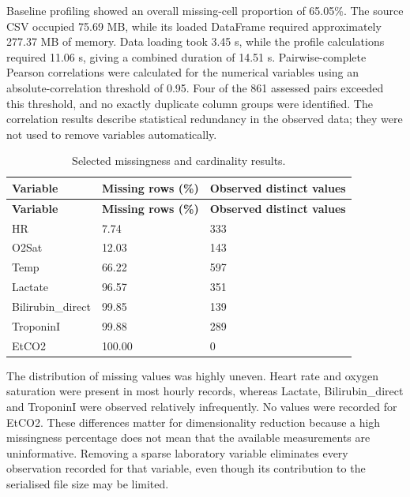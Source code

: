 Baseline profiling showed an overall missing-cell proportion of 65.05\%. The source CSV occupied 75.69 MB, while its loaded DataFrame required approximately 277.37 MB of memory. Data loading took 3.45 s, while the profile calculations required 11.06 s, giving a combined duration of 14.51 s.
Pairwise-complete Pearson
correlations were calculated for the numerical variables using an
absolute-correlation threshold of 0.95. Four of the 861 assessed pairs
exceeded this threshold, and no exactly duplicate column groups were
identified. The correlation results describe statistical redundancy in
the observed data; they were not used to remove variables automatically.

\begin{longtable}[]{@{}lll@{}}
	\caption{Selected missingness and cardinality results.}\label{tab:chapter4-1}\\
	\toprule\noalign{}
	\textbf{Variable} & \textbf{Missing rows (\%)} & \textbf{Observed distinct values} \\
	\midrule\noalign{}
	\endfirsthead
	\toprule\noalign{}
	\textbf{Variable} & \textbf{Missing rows (\%)} & \textbf{Observed distinct values} \\
	\midrule\noalign{}
	\endhead
	\bottomrule\noalign{}
	\endlastfoot
	HR & 7.74 & 333 \\
	O2Sat & 12.03 & 143 \\
	Temp & 66.22 & 597 \\
	Lactate & 96.57 & 351 \\
	Bilirubin\_direct & 99.85 & 139 \\
	TroponinI & 99.88 & 289 \\
	EtCO2 & 100.00 & 0 \\
\end{longtable}

The distribution of missing values was highly uneven. Heart rate and
oxygen saturation were present in most hourly records, whereas Lactate,
Bilirubin\_direct and TroponinI were observed relatively infrequently.
No values were recorded for EtCO2. These differences matter for
dimensionality reduction because a high missingness percentage does not
mean that the available measurements are uninformative. Removing a
sparse laboratory variable eliminates every observation recorded for
that variable, even though its contribution to the serialised file size
may be limited.

